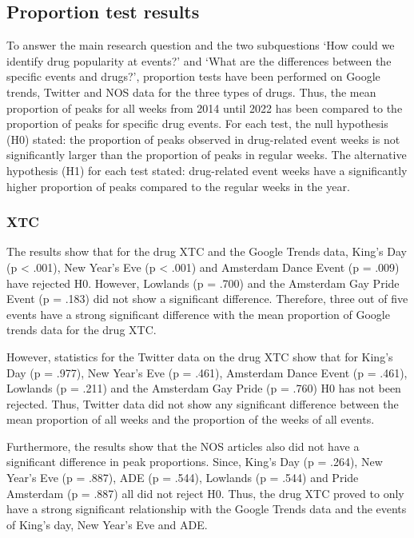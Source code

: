\subsection{Proportion test results}

To answer the main research question and the two subquestions ‘How could we identify drug popularity at events?’ and ‘What are the differences between the specific events and drugs?’, proportion tests have been performed on Google trends, Twitter and NOS data for the three types of drugs. Thus, the mean proportion of peaks for all weeks from 2014 until 2022 has been compared to the proportion of peaks for specific drug events. For each test, the null hypothesis (H0) stated: the proportion of peaks observed in drug-related event weeks is not significantly larger than the proportion of peaks in regular weeks. The alternative hypothesis (H1) for each test stated: drug-related event weeks have a significantly higher proportion of peaks compared to the regular weeks in the year.

\subsubsection{XTC}

The results show that for the drug XTC and the Google Trends data, King’s Day (p < .001), New Year’s Eve (p < .001) and Amsterdam Dance Event (p = .009) have rejected H0. However, Lowlands (p = .700) and the Amsterdam Gay Pride Event (p = .183) did not show a significant difference. Therefore, three out of five events have a strong significant difference with the mean proportion of Google trends data for the drug XTC.

However, statistics for the Twitter data on the drug XTC show that for King’s Day (p = .977), New Year’s Eve (p = .461), Amsterdam Dance Event (p = .461), Lowlands (p = .211) and the Amsterdam Gay Pride (p = .760) H0 has not been rejected. Thus, Twitter data did not show any significant difference between the mean proportion of all weeks and the proportion of the weeks of all events.

Furthermore, the results show that the NOS articles also did not have a significant difference in peak proportions. Since, King’s Day (p = .264), New Year’s Eve (p = .887), ADE (p = .544), Lowlands (p = .544) and Pride Amsterdam (p = .887) all did not reject H0. Thus, the drug XTC proved to only have a strong significant relationship with the Google Trends data and the events of King’s day, New Year’s Eve and ADE.


